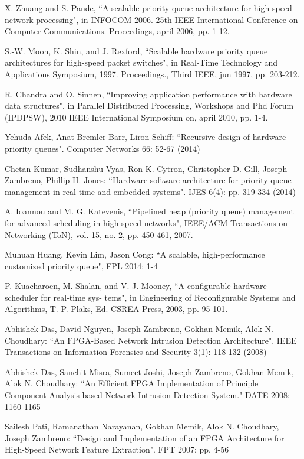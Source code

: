 \documentclass[10pt, conference, compsocconf]{IEEEtran}
\begin{document}
\begin{thebibliography}{1}
 X. Zhuang and S. Pande, ``A scalable priority queue architecture for high speed network processing", in INFOCOM 2006. 25th IEEE International Conference on Computer Communications. Proceedings, april 2006, pp. 1-12.

 S.-W. Moon, K. Shin, and J. Rexford, ``Scalable hardware priority queue architectures for high-speed packet switches", in Real-Time Technology and Applications Symposium, 1997. Proceedings., Third IEEE, jun 1997, pp. 203-212.

 R. Chandra and O. Sinnen, ``Improving application performance with hardware data structures", in Parallel Distributed Processing, Workshops and Phd Forum (IPDPSW), 2010 IEEE International Symposium on, april 2010, pp. 1-4.
	
 Yehuda Afek, Anat Bremler-Barr, Liron Schiff: ``Recursive design of hardware priority queues". Computer Networks 66: 52-67 (2014)

 Chetan Kumar, Sudhanshu Vyas, Ron K. Cytron, Christopher D. Gill, Joseph Zambreno, Phillip H. Jones:
``Hardware-software architecture for priority queue management in real-time and embedded systems". IJES 6(4): pp. 319-334 (2014)

 A. Ioannou and M. G. Katevenis, ``Pipelined heap (priority queue) management for advanced scheduling in high-speed networks", IEEE/ACM Transactions on Networking (ToN), vol. 15, no. 2, pp. 450-461, 2007.

 Muhuan Huang, Kevin Lim, Jason Cong: ``A scalable, high-performance customized priority queue", FPL 2014: 1-4

 P. Kuacharoen, M. Shalan, and V. J. Mooney, ``A configurable hardware scheduler for real-time sys-
tems", in Engineering of Reconfigurable Systems and Algorithms, T. P. Plaks, Ed. CSREA Press, 2003,
pp. 95-101.




 Abhishek Das, David Nguyen, Joseph Zambreno, Gokhan Memik, Alok N. Choudhary:
``An FPGA-Based Network Intrusion Detection Architecture". IEEE Transactions on Information Forensics and Security 3(1): 118-132 (2008)

 Abhishek Das, Sanchit Misra, Sumeet Joshi, Joseph Zambreno, Gokhan Memik, Alok N. Choudhary:
``An Efficient FPGA Implementation of Principle Component Analysis based Network Intrusion Detection System." DATE 2008: 1160-1165

 Sailesh Pati, Ramanathan Narayanan, Gokhan Memik, Alok N. Choudhary, Joseph Zambreno:
``Design and Implementation of an FPGA Architecture for High-Speed Network Feature Extraction". FPT 2007: pp. 4-56


\end{thebibliography}
\end{document}
